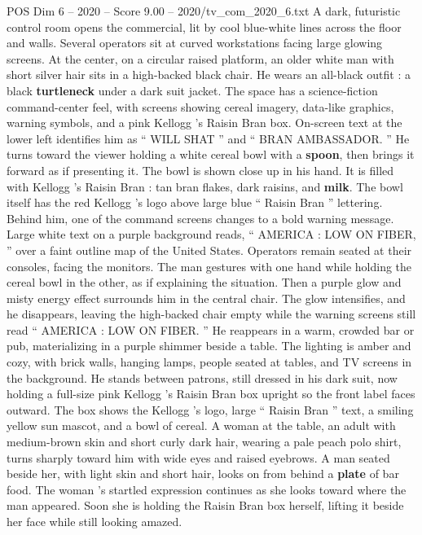 \begin{textsample}{POS Dim 6 – 2020 – Score 9.00 – 2020/tv\_com\_2020\_6.txt}  \label{ex:f6_pos_063}
A dark, futuristic control room opens the commercial, lit by cool blue-white lines across the floor and walls.
Several operators sit at curved workstations facing large glowing screens.
At the center, on a circular raised platform, an older white man with short silver hair sits in a high-backed black chair.
He wears an all-black outfit : a black \textbf{turtleneck} under a dark suit jacket.
The space has a science-fiction command-center feel, with screens showing cereal imagery, data-like graphics, warning symbols, and a pink Kellogg ’s Raisin Bran box.
On-screen text at the lower left identifies him as “ WILL SHAT ” and “ BRAN AMBASSADOR. ” He turns toward the viewer holding a white cereal bowl with a \textbf{spoon}, then brings it forward as if presenting it.
The bowl is shown close up in his hand.
It is filled with Kellogg ’s Raisin Bran : tan bran flakes, dark raisins, and \textbf{milk}.
The bowl itself has the red Kellogg ’s logo above large blue “ Raisin Bran ” lettering.
Behind him, one of the command screens changes to a bold warning message.
Large white text on a purple background reads, “ AMERICA : LOW ON FIBER, ” over a faint outline map of the United States.
Operators remain seated at their consoles, facing the monitors.
The man gestures with one hand while holding the cereal bowl in the other, as if explaining the situation.
Then a purple glow and misty energy effect surrounds him in the central chair.
The glow intensifies, and he disappears, leaving the high-backed chair empty while the warning screens still read “ AMERICA : LOW ON FIBER. ” He reappears in a warm, crowded bar or pub, materializing in a purple shimmer beside a table.
The lighting is amber and cozy, with brick walls, hanging lamps, people seated at tables, and TV screens in the background.
He stands between patrons, still dressed in his dark suit, now holding a full-size pink Kellogg ’s Raisin Bran box upright so the front label faces outward.
The box shows the Kellogg ’s logo, large “ Raisin Bran ” text, a smiling yellow sun mascot, and a bowl of cereal.
A woman at the table, an adult with medium-brown skin and short curly dark hair, wearing a pale peach polo shirt, turns sharply toward him with wide eyes and raised eyebrows.
A man seated beside her, with light skin and short hair, looks on from behind a \textbf{plate} of bar food.
The woman ’s startled expression continues as she looks toward where the man appeared.
Soon she is holding the Raisin Bran box herself, lifting it beside her face while still looking amazed.

\end{textsample}
